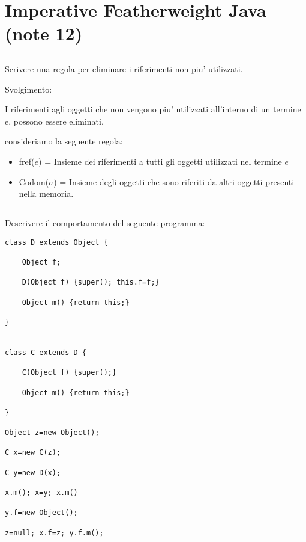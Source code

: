 \section{Imperative Featherweight Java (note 12)}
\vspace{1cm}

\subsection*{}
Scrivere una regola per eliminare i riferimenti non piu' utilizzati.


Svolgimento:


I riferimenti agli oggetti che non vengono piu' utilizzati all'interno di un termine e, possono essere eliminati.

consideriamo la seguente regola:

\begin{prooftree}
	\end{prooftree}

\vspace{0,5cm}

\begin{itemize}
\item fref($e$) = Insieme dei riferimenti a tutti gli oggetti utilizzati nel termine $e$
\item Codom($\sigma$) = Insieme degli oggetti che sono riferiti da altri oggetti presenti nella memoria.
\end{itemize}

\vspace{1,5cm}



\subsection*{}
Descrivere il comportamento del seguente programma:
 
\begin{lstlisting}
class D extends Object {

	Object f; 
	
	D(Object f) {super(); this.f=f;}
 
	Object m() {return this;}
	
}


class C extends D {

	C(Object f) {super();}
 
	Object m() {return this;}

}

Object z=new Object();

C x=new C(z);

C y=new D(x);

x.m(); x=y; x.m()

y.f=new Object();

z=null; x.f=z; y.f.m();

\end{lstlisting}

